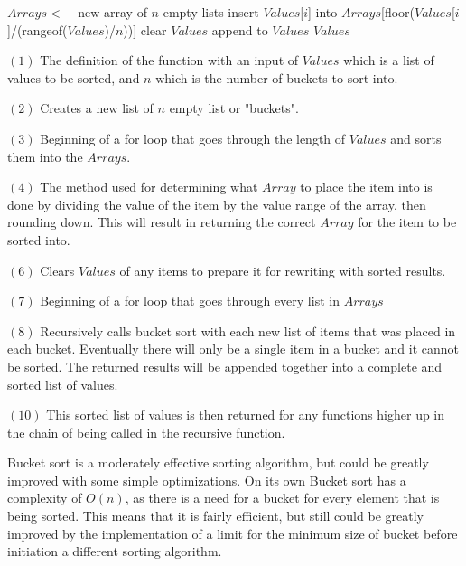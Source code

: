 \documentclass{article}
\begin{document}
\begin{algorithmic}
\State $Arrays<-$ new array of $n$ empty lists
\State insert $Values$[$i$] into $Arrays$[floor($Values$[$i$]/(rangeof($Values$)/$n$))]
\EndFor
\State clear $Values$
\State append  to $Values$
\EndFor
\State \Return $Values$
\EndFunction
\end{algorithmic}
\begin{multicols}{2}
$(1)$ The definition of the function with an input of $Values$ which is a list of values to be sorted, and $n$ which is the number of buckets to sort into.

$(2)$ Creates a new list of $n$ empty list or "buckets".

$(3)$ Beginning of a for loop that goes through the length of $Values$ and sorts them into the $Arrays$.

$(4)$  The method used for determining what $Array$ to place the item into is done by dividing the value of the item by the value range of the array, then rounding down. This will result in returning the correct $Array$ for the item to be sorted into.

$(6)$ Clears $Values$ of any items to prepare it for rewriting with sorted results.

$(7)$ Beginning of a for loop that goes through every list in $Arrays$

$(8)$ Recursively calls bucket sort with each new list of items that was placed in each bucket. Eventually there will only be a single item in a bucket and it cannot be sorted. The returned results will be appended together into a complete and sorted list of values.

$(10)$ This sorted list of values is then returned for any functions higher up in the chain of being called in the recursive function.
\end{multicols}
\begin{multicols}{2}
Bucket sort is a moderately effective sorting algorithm, but could be greatly improved with some simple optimizations. On its own Bucket sort has a complexity of $O(n)$, as there is a need for a bucket for every element that is being sorted. This means that it is fairly efficient, but still could be greatly improved by the implementation of a limit for the minimum size of bucket before initiation a different sorting algorithm.
\end{multicols}
\end{document}
